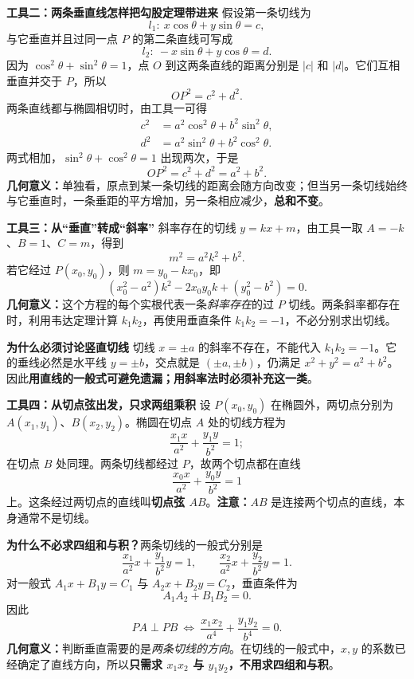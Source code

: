 \begin{explanationbox}
  \medskip
  \textbf{\textcolor{CExplanation}{工具二：两条垂直线怎样把勾股定理带进来}}
  假设第一条切线为
  \[
    l_1:\ x\cos\theta+y\sin\theta=c,
  \]
  与它垂直并且过同一点 $P$ 的第二条直线可写成
  \[
    l_2:\ -x\sin\theta+y\cos\theta=d.
  \]
  因为 $\cos^2\theta+\sin^2\theta=1$，点 $O$ 到这两条直线的距离分别是 $|c|$ 和 $|d|$。它们互相垂直并交于 $P$，所以
  \[
    OP^2=c^2+d^2.
  \]
  两条直线都与椭圆相切时，由工具一可得
  \[
    \begin{aligned}
       c^2&=a^2\cos^2\theta+b^2\sin^2\theta,\\
       d^2&=a^2\sin^2\theta+b^2\cos^2\theta.
    \end{aligned}
  \]
  两式相加，$\sin^2\theta+\cos^2\theta=1$ 出现两次，于是
  \[
    OP^2=c^2+d^2=a^2+b^2.
  \]
  \textbf{几何意义：}单独看，原点到某一条切线的距离会随方向改变；但当另一条切线始终与它垂直时，一条垂距的平方增加，另一条相应减少，\textbf{总和不变}。

  \medskip
  \textbf{\textcolor{CExplanation}{工具三：从“垂直”转成“斜率”}}
  斜率存在的切线 $y=kx+m$，由工具一取 $A=-k$、$B=1$、$C=m$，得到
  \[
    \boxed{m^2=a^2k^2+b^2}.
  \]
  若它经过 $P(x_0,y_0)$，则 $m=y_0-kx_0$，即
  \[
    \boxed{(x_0^2-a^2)k^2-2x_0y_0k+(y_0^2-b^2)=0.}
  \]
  \textbf{几何意义：}这个方程的每个实根代表一条\emph{斜率存在}的过 $P$ 切线。两条斜率都存在时，利用韦达定理计算 $k_1k_2$，再使用垂直条件 $k_1k_2=-1$，不必分别求出切线。

  \medskip
  \textbf{\textcolor{CExplanation}{为什么必须讨论竖直切线}}
  切线 $x=\pm a$ 的斜率不存在，不能代入 $k_1k_2=-1$。它的垂线必然是水平线 $y=\pm b$，交点就是 $(\pm a,\pm b)$，仍满足 $x^2+y^2=a^2+b^2$。因此\textbf{用直线的一般式可避免遗漏；用斜率法时必须补充这一类}。

  \medskip

  \medskip
  \textbf{\textcolor{CExplanation}{工具四：从切点弦出发，只求两组乘积}}
  设 $P(x_0,y_0)$ 在椭圆外，两切点分别为 $A(x_1,y_1)$、$B(x_2,y_2)$。椭圆在切点 $A$ 处的切线方程为
  \[
    \frac{x_1x}{a^2}+\frac{y_1y}{b^2}=1;
  \]
  在切点 $B$ 处同理。两条切线都经过 $P$，故两个切点都在直线
  \[
    \boxed{\frac{x_0x}{a^2}+\frac{y_0y}{b^2}=1}
  \]
  上。这条经过两切点的直线叫\textbf{切点弦 $AB$}。\textbf{注意：}$AB$ 是连接两个切点的直线，本身通常不是切线。

  \medskip
  \textbf{为什么不必求四组和与积？}两条切线的一般式分别是
  \[
    \frac{x_1}{a^2}x+\frac{y_1}{b^2}y=1,\qquad
    \frac{x_2}{a^2}x+\frac{y_2}{b^2}y=1.
  \]
  对一般式 $A_1x+B_1y=C_1$ 与 $A_2x+B_2y=C_2$，垂直条件为
  \[
    A_1A_2+B_1B_2=0.
  \]
  因此
  \[
    \boxed{PA\perp PB\ \Longleftrightarrow\
    \frac{x_1x_2}{a^4}+\frac{y_1y_2}{b^4}=0}.
  \]
  \textbf{几何意义：}判断垂直需要的是\emph{两条切线的方向}。在切线的一般式中，$x,y$ 的系数已经确定了直线方向，所以\textbf{只需求 $x_1x_2$ 与 $y_1y_2$，不用求四组和与积}。


\end{explanationbox}

